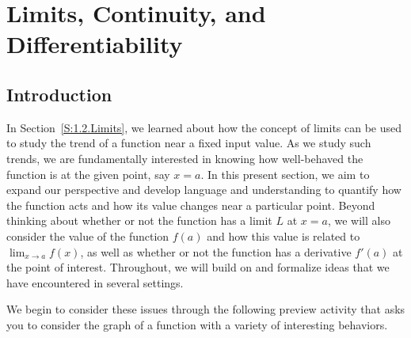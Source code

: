 \section{Limits, Continuity, and Differentiability} \label{S:1.7.LimContDiff}

\vspace*{-14 pt}

\subsection*{Introduction}
In Section~\ref{S:1.2.Limits}, we learned about how the concept of limits can be used to study the trend of a function near a fixed input value.  As we study such trends, we are fundamentally interested in knowing how well-behaved the function is at the given point, say $x = a$.  In this present section, we aim to expand our perspective and develop language and understanding to quantify how the function acts and how its value changes near a particular point.  Beyond thinking about whether or not the function has a limit $L$ at $x = a$, we will also consider the value of the function $f(a)$ and how this value is related to $\lim_{x \to a} f(x)$, as well as whether or not the function has a derivative $f'(a)$ at the point of interest.  Throughout,  we will build on and formalize ideas that we have encountered in several settings.

We begin to consider these issues through the following preview activity that asks you to consider the graph of a function with a variety of interesting behaviors.

